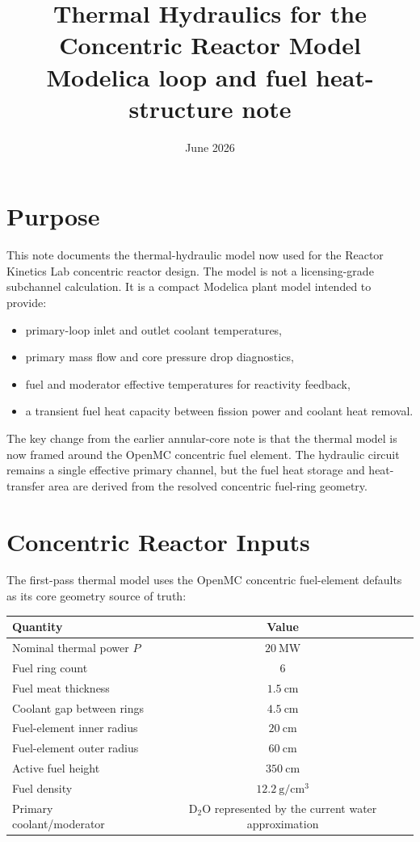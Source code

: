 \documentclass[11pt]{article}
\title{Thermal Hydraulics for the Concentric Reactor Model\\[0.4em]
\large Modelica loop and fuel heat-structure note}
\author{}
\date{June 2026}
\begin{document}
\maketitle
\tableofcontents
\newpage

\section{Purpose}

This note documents the thermal-hydraulic model now used for the
Reactor Kinetics Lab concentric reactor design.  The model is not a
licensing-grade subchannel calculation.  It is a compact Modelica plant
model intended to provide:
\begin{itemize}
  \item primary-loop inlet and outlet coolant temperatures,
  \item primary mass flow and core pressure drop diagnostics,
  \item fuel and moderator effective temperatures for reactivity feedback,
  \item a transient fuel heat capacity between fission power and coolant heat removal.
\end{itemize}

The key change from the earlier annular-core note is that the thermal
model is now framed around the OpenMC concentric fuel element.  The
hydraulic circuit remains a single effective primary channel, but the
fuel heat storage and heat-transfer area are derived from the resolved
concentric fuel-ring geometry.

\section{Concentric Reactor Inputs}

The first-pass thermal model uses the OpenMC concentric fuel-element
defaults as its core geometry source of truth:

\begin{center}
\begin{tabular}{lc}
\hline
Quantity & Value \\
\hline
Nominal thermal power $P$ & $20\ \mathrm{MW}$ \\
Fuel ring count & $6$ \\
Fuel meat thickness & $1.5\ \mathrm{cm}$ \\
Coolant gap between rings & $4.5\ \mathrm{cm}$ \\
Fuel-element inner radius & $20\ \mathrm{cm}$ \\
Fuel-element outer radius & $60\ \mathrm{cm}$ \\
Active fuel height & $350\ \mathrm{cm}$ \\
Fuel density & $12.2\ \mathrm{g/cm^3}$ \\
Primary coolant/moderator & D$_2$O represented by the current water approximation \\
\hline
\end{tabular}
\end{center}
\end{document}
